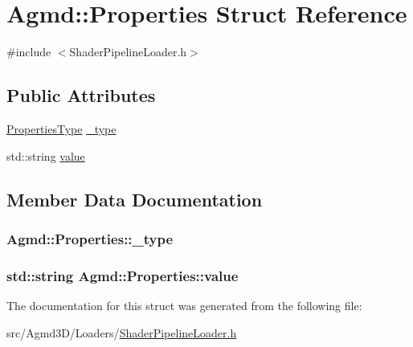\hypertarget{struct_agmd_1_1_properties}{\section{Agmd\+:\+:Properties Struct Reference}
\label{struct_agmd_1_1_properties}
}


{\ttfamily \#include $<$Shader\+Pipeline\+Loader.\+h$>$}

\subsection*{Public Attributes}
\begin{DoxyCompactItemize}
\item 
\hyperlink{namespace_agmd_a3997fdb81780d44e2c5951be3a650f2f}{Properties\+Type} \hyperlink{struct_agmd_1_1_properties_aa80c2b872d5b9763b4f5d8faaaae2c97}{\+\_\+type}
\item 
std\+::string \hyperlink{struct_agmd_1_1_properties_ad3ac8d7a3e631fe2002b857785f65e3b}{value}
\end{DoxyCompactItemize}


\subsection{Member Data Documentation}
\hypertarget{struct_agmd_1_1_properties_aa80c2b872d5b9763b4f5d8faaaae2c97}{
\subsubsection[{\+\_\+type}]{ Agmd\+::\+Properties\+::\+\_\+type}}\label{struct_agmd_1_1_properties_aa80c2b872d5b9763b4f5d8faaaae2c97}
\hypertarget{struct_agmd_1_1_properties_ad3ac8d7a3e631fe2002b857785f65e3b}{
\subsubsection[{value}]{\setlength{\rightskip}{0pt plus 5cm}std\+::string Agmd\+::\+Properties\+::value}}\label{struct_agmd_1_1_properties_ad3ac8d7a3e631fe2002b857785f65e3b}


The documentation for this struct was generated from the following file\+:\begin{DoxyCompactItemize}
\item 
src/\+Agmd3\+D/\+Loaders/\hyperlink{_shader_pipeline_loader_8h}{Shader\+Pipeline\+Loader.\+h}\end{DoxyCompactItemize}
